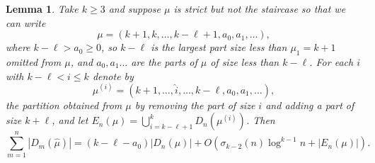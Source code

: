 \documentclass{article}
\theoremstyle{plain}
\newtheorem{lemma}[theorem]{Lemma}
\theoremstyle{definition}
\begin{document}
\begin{lemma}\label{lem:decomp a>0} Take $k\geq 3$ and suppose $\mu$ is strict but not the staircase so that we can write  
$$\mu = (k+1,k,\ldots, k-\ell+1, a_0, a_1,\ldots),$$
where $k-\ell> a_0 \geq 0$, so $k-\ell$ is the largest part size less than $\mu_1=k+1$ omitted from $\mu$, and $a_0,a_1 \ldots$ are the parts of $\mu$ of size less than $k-\ell$. For each $i$ with $ k - \ell < i \leq k$ denote by 
$$\mu^{(i)} = (k+1, \ldots, \widehat i,\ldots, k-\ell, a_0, a_1,\ldots),$$ 
the partition obtained from $\mu$ by removing the part of size $i$ and adding a part of size $k+\ell$, and let ${E_n(\mu) = \bigcup_{i = k - \ell+1}^k D_n(\mu^{(i)})}$. Then $$\sum_{m=1}^{n} |D_{m}(\hat\mu)| = (k-\ell-a_0)|D_n(\mu)| + 
    O\left(\sigma_{k-2}(n)\log^{k-1} n +\left|E_n(\mu)\right| \right).$$
\end{lemma}
\end{document}
